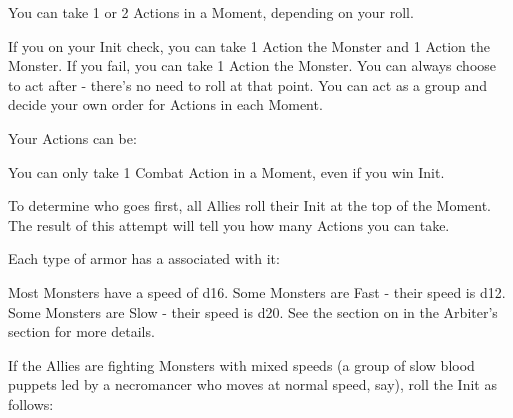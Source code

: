 {  You can take 1 or 2 Actions in a Moment, depending on your  roll. 

  If you \RO on your Init check, you can take 1 Action  the Monster and 1 Action  the Monster. If you fail, you can take 1 Action  the Monster. You can always choose to act after - there's no need to roll at that point. You can act as a group and decide your own order for Actions in each Moment. 


  Your Actions can be:

  You can only take 1 Combat Action in a Moment, even if you win Init.




  To determine who goes first, all Allies roll their Init at the top of the Moment. The result of this \RO attempt will tell you how many Actions you can take.


  Each type of armor has a \MD associated with it:



  Most Monsters have a speed of d16.  Some Monsters are Fast - their speed is d12.  Some Monsters are Slow - their speed is d20.  See the section on  in the Arbiter's section for more details.


  If the Allies are fighting Monsters with mixed speeds (a group of slow blood puppets led by a necromancer who moves at normal speed, say), roll the Init as follows:

}
